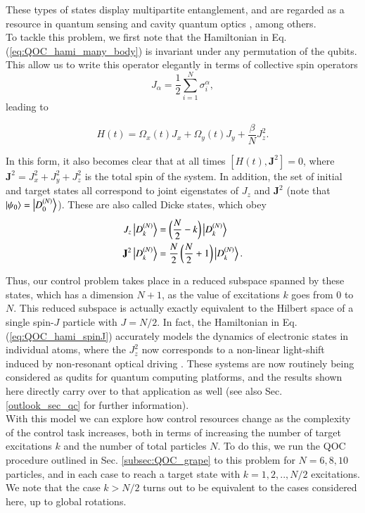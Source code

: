 These types of states display multipartite entanglement, and are regarded as a resource in quantum sensing \cite{toth2012} and cavity quantum optics \cite{pezze2018}, among others. \\

To tackle this problem, we first note that the Hamiltonian in Eq. (\ref{eq:QOC_hami_many_body}) is invariant under any permutation of the qubits. This allow us to write this operator elegantly in terms of collective spin operators
\begin{equation}
    J_\alpha = \frac{1}{2} \sum\limits_{i=1}^N \sigma_i^\alpha,
\end{equation}
leading to

\begin{equation}
    H(t) = \Omega_x(t) J_x + \Omega_y(t) J_y + \frac{\beta}{N} J_z^2.
\label{eq:QOC_hami_spinJ}
\end{equation}

In this form, it also becomes clear that at all times $[H(t),\mathbf{J}^2]=0$, where $\mathbf{J}^2=J_x^2+J_y^2+J_z^2$ is the total spin of the system. In addition, the set of initial and target states all correspond to joint eigenstates of $J_z$ and $\mathbf{J}^2$ (note that $\ket{\psi_0}=\ket{D_0^{(N)}}$). These are also called Dicke states, which obey \cite{dicke1954}
\begin{align}
    J_z \ket{D_k^{(N)}} &= \left(\frac{N}{2}-k\right)\ket{D_k^{(N)}} \\
    \mathbf{J}^2 \ket{D_k^{(N)}} &= \frac{N}{2}\left(\frac{N}{2}+1\right)\ket{D_k^{(N)}}.
\end{align}

Thus, our control problem takes place in a reduced subspace spanned by these states, which has a dimension $N+1$, as the value of excitations $k$ goes from 0 to $N$. This reduced subspace is actually exactly equivalent to the Hilbert space of a single spin-$J$ particle with $J=N/2$. In fact, the Hamiltonian in Eq. (\ref{eq:QOC_hami_spinJ}) accurately models the dynamics of electronic states in individual atoms, where the $J_z^2$ now corresponds to a non-linear light-shift induced by non-resonant optical driving \cite{deutsch2010}. These systems are now routinely being considered as qudits for quantum computing platforms, and the results shown here directly carry over to that application as well \cite{omanakuttan2021} (see also Sec. \ref{outlook_sec_qc} for further information).\\

With this model we can explore how control resources change as the complexity of the control task increases, both in terms of increasing the number of target excitations $k$ and the number of total particles $N$. To do this, we run the QOC procedure outlined in Sec. \ref{subsec:QOC_grape} to this problem for $N=6,8,10$ particles, and in each case to reach a target state with $k=1,2,..,N/2$ excitations. We note that the case $k>N/2$ turns out to be equivalent to the cases considered here, up to global rotations. \\

